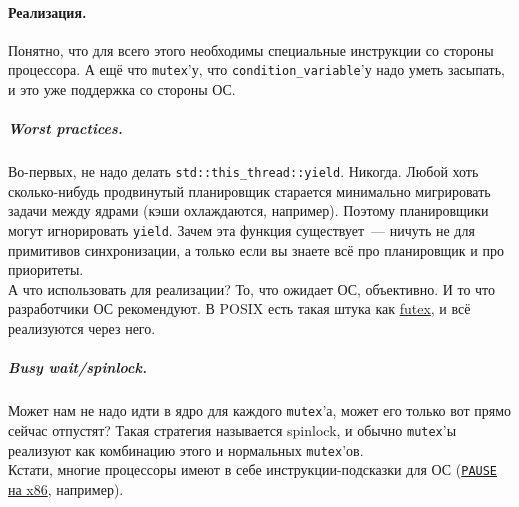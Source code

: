 \documentclass{article}
\begin{document}
    \paragraph{Реализация.}
    Понятно, что для всего этого необходимы специальные инструкции со стороны процессора. А ещё что \Verb|mutex|'у, что \Verb|condition_variable|'у надо уметь засыпать, и это уже поддержка со стороны ОС.
    \subparagraph{Worst practices.}
    Во-первых, не надо делать \texttt{std::this_thread::yield}. Никогда. Любой хоть сколько-нибудь продвинутый планировщик старается минимально мигрировать задачи между ядрами (кэши охлаждаются, например). Поэтому планировщики могут игнорировать \texttt{yield}. Зачем эта функция существует~--- ничуть не для примитивов синхронизации, а только если вы знаете всё про планировщик и про приоритеты.\\
    А что использовать для реализации? То, что ожидает ОС, объективно. И то что разработчики ОС рекомендуют. В POSIX есть такая штука как \href{https://en.wikipedia.org/wiki/Futex}{futex}, и всё реализуются через него.
    \subparagraph{Busy wait/spinlock.}
    Может нам не надо идти в ядро для каждого \Verb|mutex|'а, может его только вот прямо сейчас отпустят? Такая стратегия называется spinlock, и обычно \texttt{mutex}'ы реализуют как комбинацию этого и нормальных \Verb|mutex|'ов.\\
    Кстати, многие процессоры имеют в себе инструкции-подсказки для ОС (\href{https://www.felixcloutier.com/x86/pause}{\texttt{PAUSE} на x86}, например).
\end{document}

